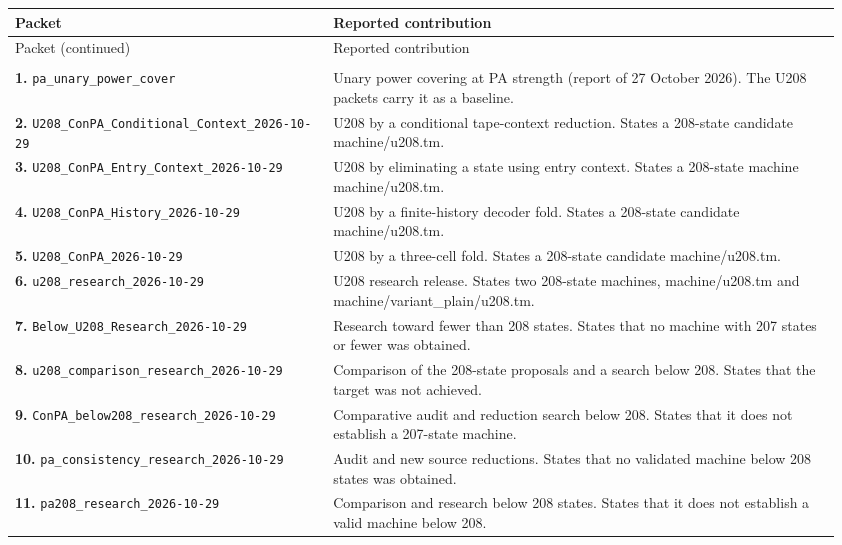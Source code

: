 {\footnotesize
\begin{longtable}{@{}>{\raggedright\arraybackslash}p{0.37\linewidth}>{\raggedright\arraybackslash}p{0.59\linewidth}@{}}
\toprule Packet & Reported contribution\\\midrule\endfirsthead
\toprule Packet (continued) & Reported contribution\\\midrule\endhead
\midrule\multicolumn{2}{r}{Continued on next page}\\\endfoot
\bottomrule\endlastfoot
\textbf{1.} \nolinkurl{pa_unary_power_cover} & Unary power covering at PA strength (report of 27 October 2026). The U208 packets carry it as a baseline.\\[5pt]
\textbf{2.} \nolinkurl{U208_ConPA_Conditional_Context_2026-10-29} & U208 by a conditional tape-context reduction. States a 208-state candidate machine/u208.tm.\\[5pt]
\textbf{3.} \nolinkurl{U208_ConPA_Entry_Context_2026-10-29} & U208 by eliminating a state using entry context. States a 208-state machine machine/u208.tm.\\[5pt]
\textbf{4.} \nolinkurl{U208_ConPA_History_2026-10-29} & U208 by a finite-history decoder fold. States a 208-state candidate machine/u208.tm.\\[5pt]
\textbf{5.} \nolinkurl{U208_ConPA_2026-10-29} & U208 by a three-cell fold. States a 208-state candidate machine/u208.tm.\\[5pt]
\textbf{6.} \nolinkurl{u208_research_2026-10-29} & U208 research release. States two 208-state machines, machine/u208.tm and machine/variant\_plain/u208.tm.\\[5pt]
\textbf{7.} \nolinkurl{Below_U208_Research_2026-10-29} & Research toward fewer than 208 states. States that no machine with 207 states or fewer was obtained.\\[5pt]
\textbf{8.} \nolinkurl{u208_comparison_research_2026-10-29} & Comparison of the 208-state proposals and a search below 208. States that the target was not achieved.\\[5pt]
\textbf{9.} \nolinkurl{ConPA_below208_research_2026-10-29} & Comparative audit and reduction search below 208. States that it does not establish a 207-state machine.\\[5pt]
\textbf{10.} \nolinkurl{pa_consistency_research_2026-10-29} & Audit and new source reductions. States that no validated machine below 208 states was obtained.\\[5pt]
\textbf{11.} \nolinkurl{pa208_research_2026-10-29} & Comparison and research below 208 states. States that it does not establish a valid machine below 208.\\[5pt]

\end{longtable}}
